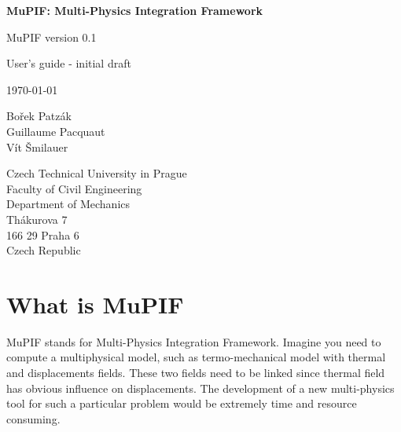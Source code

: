 \documentclass[a4paper,11pt]{article}
\begin{document}
\begin{center}
\thispagestyle{empty}

{\huge\bf MuPIF: Multi-Physics Integration Framework}

\vspace{5 mm}

{\large MuPIF version 0.1}\\

\vspace{30 mm}

{\huge User's guide - initial draft}\\

\vspace{30 mm}

{\Large \today}\\

\vspace{30 mm}

{\Large Bořek Patzák\\Guillaume Pacquaut\\Vít Šmilauer}\\

\vspace{60 mm}

\noindent Czech Technical University in Prague\\
Faculty of Civil Engineering\\
Department of Mechanics\\
Th\'akurova 7\\
166 29 Praha 6\\
Czech Republic\\

\vspace{20 mm}

\end{center}

\clearpage
{}%
\tableofcontents

\clearpage


\section{What is MuPIF}
MuPIF stands for Multi-Physics Integration Framework. Imagine you need to compute a multiphysical model, such as termo-mechanical model with thermal and displacements fields. These two fields need to be linked  since thermal field has obvious influence on displacements. The development of a new multi-physics tool for such a particular problem would be extremely time and resource consuming.
\end{document}

